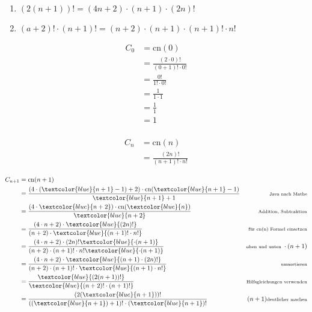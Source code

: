 \documentclass{lehramt-informatik-aufgabe}
\begin{document}
\begin{enumerate}
\begin{enumerate}

\item $(2(n + 1))! = (4n + 2) \cdot (n + 1) \cdot (2n)!$

\item $(a + 2)! \cdot (n+1)! = (n + 2) \cdot (n + 1) \cdot (n + 1)! \cdot n!$
\end{enumerate}

\begin{liAntwort}
%

\liInduktionAnfang

\begin{align*}
C_0
& = \text{cn}(0)\\
& = \frac{(2 \cdot 0)!}{(0 + 1)! \cdot 0!}\\
& = \frac{0!}{1! \cdot 0!}\\
& = \frac{1}{1 \cdot 1}\\
& = \frac{1}{1}\\
& = 1\\
\end{align*}

%

\liInduktionVoraussetzung

\begin{align*}
C_n
& = \text{cn}(n)\\
& = \frac{(2n)!}{(n + 1)! \cdot n!}
\end{align*}

%

\liInduktionSchritt

\def\e#1{\scriptsize#1}
\def\et#1{\scriptsize\text{#1}}

\def\r#1{\textcolor{blue}{#1}}

\begin{align*}
C_{n+1}
& = \text{cn}(n + 1)\\
& = \frac
  {(4 \cdot (\r{n + 1} - 1) + 2) \cdot \text{cn}(\r{n + 1} - 1)}
  {\r{n + 1} + 1}
  & \et{Java nach Mathe}\\
%
& = \frac
  {(4 \cdot \r{n + 2}) \cdot \text{cn}(\r{n})}
  {\r{n + 2}}
  & \et{Addition, Subtraktion}\\
%
& = \frac
  {(4 \cdot n + 2) \cdot \r{(2n)!}}
  {(n + 2) \cdot \r{(n + 1)! \cdot n!}}
  & \et{für cn(n) Formel einsetzen}\\
%
& = \frac
  {(4 \cdot n + 2) \cdot (2n)! \r{\cdot (n + 1)}}
  {(n + 2) \cdot (n + 1)! \cdot n! \r{\cdot (n + 1)}}
  & \e{\text{oben und unten } \cdot (n + 1)} \\
%
& = \frac
  {(4 \cdot n + 2) \cdot \r{(n + 1) \cdot (2n)!}}
  {(n + 2) \cdot (n + 1)! \cdot \r{(n + 1) \cdot n!}} & \et{umsortieren} \\
%
& = \frac
  {\r{(2(n + 1))!}}
  {\r{(n + 2)! \cdot (n + 1)!}} & \et{Hilfsgleichungen verwenden}\\
%
& = \frac
  {(2(\r{n + 1}))!}
  {((\r{n + 1}) + 1)! \cdot (\r{n + 1})!} & \e{(n + 1) \text{deutlicher machen}}\\
\end{align*}


\end{liAntwort}
\end{enumerate}
\end{document}
